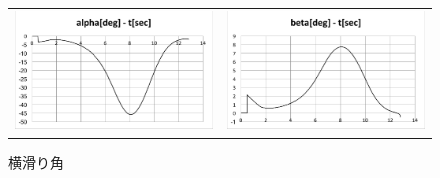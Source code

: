 \documentclass[a4paper]{jarticle}
\begin{document}
\begin{figure}[H]
  \begin{tabular}{cc}
    \centering
    \begin{minipage}{0.45\hsize}
      \includegraphics[scale=0.55]{./alpha.eps}
      \caption{迎え角}
    \end{minipage} &
    \begin{minipage}{0.45\hsize}
       \includegraphics[scale=0.55]{./beta.eps}
       \caption{横滑り角}
      \end{minipage}
  \end{tabular}
\end{figure}
\end{document}
